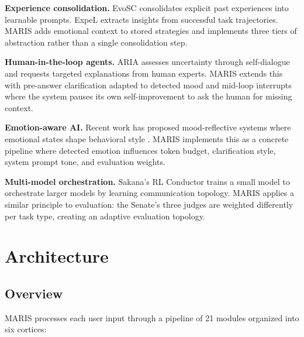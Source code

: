 \documentclass[11pt,a4paper]{article}
\begin{document}
\textbf{Experience consolidation.} EvoSC \cite{evosc2026} consolidates explicit past experiences into learnable prompts. ExpeL \cite{expel2024} extracts insights from successful task trajectories. MARIS adds emotional context to stored strategies and implements three tiers of abstraction rather than a single consolidation step.

\textbf{Human-in-the-loop agents.} ARIA \cite{aria2026} assesses uncertainty through self-dialogue and requests targeted explanations from human experts. MARIS extends this with pre-answer clarification adapted to detected mood and mid-loop interrupts where the system pauses its own self-improvement to ask the human for missing context.

\textbf{Emotion-aware AI.} Recent work has proposed mood-reflective systems where emotional states shape behavioral style \cite{affectivecomputing2026}. MARIS implements this as a concrete pipeline where detected emotion influences token budget, clarification style, system prompt tone, and evaluation weights.

\textbf{Multi-model orchestration.} Sakana's RL Conductor \cite{sakana2026} trains a small model to orchestrate larger models by learning communication topology. MARIS applies a similar principle to evaluation: the Senate's three judges are weighted differently per task type, creating an adaptive evaluation topology.

\section{Architecture}

\subsection{Overview}

MARIS processes each user input through a pipeline of 21 modules organized into six cortices:
\end{document}
